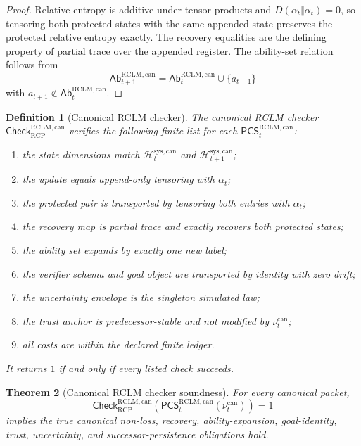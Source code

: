 \documentclass[11pt,a4paper]{article}
\newtheorem{theorem}{Theorem}[section]
\newtheorem{definition}[theorem]{Definition}
\newcommand{\Hcal}{\mathcal H}
\newcommand{\RCP}{\mathrm{RCP}}
\newcommand{\RCLM}{\mathrm{RCLM}}
\newcommand{\sys}{\mathrm{sys}}
\begin{document}
\begin{proof}
Relative entropy is additive under tensor products and \(D(\alpha_t\Vert\alpha_t)=0\), so tensoring both protected states with the same appended state preserves the protected relative entropy exactly.  The recovery equalities are the defining property of partial trace over the appended register.  The ability-set relation follows from
\[
\mathsf{Ab}_{t+1}^{\RCLM,\mathrm{can}}
=
\mathsf{Ab}_{t}^{\RCLM,\mathrm{can}}\cup\{a_{t+1}\}
\]
with \(a_{t+1}\notin\mathsf{Ab}_t^{\RCLM,\mathrm{can}}\).
\end{proof}

\begin{definition}[Canonical RCLM checker]
\label{def:rclm-batch13r-canonical-checker}
The canonical RCLM checker \(\mathsf{Check}_{\RCP}^{\RCLM,\mathrm{can}}\) verifies the following finite list for each \(\mathsf{PCS}_t^{\RCLM,\mathrm{can}}\):
\begin{enumerate}[label=(\roman*),leftmargin=1.5em]
    \item the state dimensions match \(\Hcal_t^{\sys,\mathrm{can}}\) and \(\Hcal_{t+1}^{\sys,\mathrm{can}}\);
    \item the update equals append-only tensoring with \(\alpha_t\);
    \item the protected pair is transported by tensoring both entries with \(\alpha_t\);
    \item the recovery map is partial trace and exactly recovers both protected states;
    \item the ability set expands by exactly one new label;
    \item the verifier schema and goal object are transported by identity with zero drift;
    \item the uncertainty envelope is the singleton simulated law;
    \item the trust anchor is predecessor-stable and not modified by \(\nu_t^{\mathrm{can}}\);
    \item all costs are within the declared finite ledger.
\end{enumerate}
It returns \(1\) if and only if every listed check succeeds.
\end{definition}

\begin{theorem}[Canonical RCLM checker soundness]
\label{thm:rclm-batch13r-canonical-checker-soundness}
For every canonical packet,
\[
\mathsf{Check}_{\RCP}^{\RCLM,\mathrm{can}}
(\mathsf{PCS}_t^{\RCLM,\mathrm{can}}(\nu_t^{\mathrm{can}}))=1
\]
implies the true canonical non-loss, recovery, ability-expansion, goal-identity, trust, uncertainty, and successor-persistence obligations hold.
\end{theorem}
\end{document}
